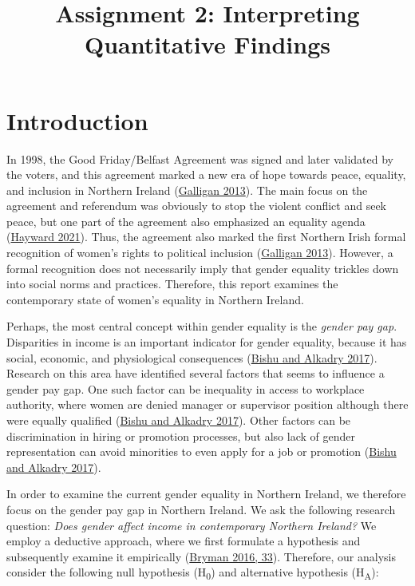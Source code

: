 \documentclass[
]{article}
\title{Assignment 2: Interpreting Quantitative Findings}
\subtitle{\hfill\break
University of Glasgow\\
\strut \\
Student ID: 2819052\\
Course: Quantitative Methods\\
Number of words: 1076}
\author{}
\date{\vspace{-2.5em}}
\begin{document}
\maketitle

\pagebreak

\setcounter{tocdepth}{2}
\tableofcontents

\pagebreak

\hypertarget{introduction}{%
\section{Introduction}\label{introduction}}

In 1998, the Good Friday/Belfast Agreement was signed and later
validated by the voters, and this agreement marked a new era of hope
towards peace, equality, and inclusion in Northern Ireland
(\protect\hyperlink{ref-galligan2013gender}{Galligan 2013}). The main
focus on the agreement and referendum was obviously to stop the violent
conflict and seek peace, but one part of the agreement also emphasized
an equality agenda (\protect\hyperlink{ref-Hayward2021}{Hayward 2021}).
Thus, the agreement also marked the first Northern Irish formal
recognition of women's rights to political inclusion
(\protect\hyperlink{ref-galligan2013gender}{Galligan 2013}). However, a
formal recognition does not necessarily imply that gender equality
trickles down into social norms and practices. Therefore, this report
examines the contemporary state of women's equality in Northern Ireland.

Perhaps, the most central concept within gender equality is the
\emph{gender pay gap}. Disparities in income is an important indicator
for gender equality, because it has social, economic, and physiological
consequences (\protect\hyperlink{ref-bishu2017gender}{Bishu and Alkadry
2017}). Research on this area have identified several factors that seems
to influence a gender pay gap. One such factor can be inequality in
access to workplace authority, where women are denied manager or
supervisor position although there were equally qualified
(\protect\hyperlink{ref-bishu2017gender}{Bishu and Alkadry 2017}). Other
factors can be discrimination in hiring or promotion processes, but also
lack of gender representation can avoid minorities to even apply for a
job or promotion (\protect\hyperlink{ref-bishu2017gender}{Bishu and
Alkadry 2017}).

In order to examine the current gender equality in Northern Ireland, we
therefore focus on the gender pay gap in Northern Ireland. We ask the
following research question: \emph{Does gender affect income in
contemporary Northern Ireland?} We employ a deductive approach, where we
first formulate a hypothesis and subsequently examine it empirically
(\protect\hyperlink{ref-bryman2016social}{Bryman 2016, 33}). Therefore,
our analysis consider the following null hypothesis (H\textsubscript{0})
and alternative hypothesis (H\textsubscript{A}):
\end{document}
